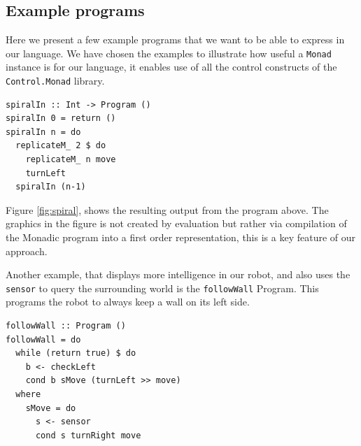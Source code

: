 \subsection{Example programs}
\FloatBarrier

Here we present a few example programs that we want to be able to express in 
our language. We have chosen the examples to illustrate how useful a 
{\tt Monad} instance is for our language, it enables use of all the control 
constructs of the {\tt Control.Monad} library. 

\begin{small}
\begin{verbatim} 
spiralIn :: Int -> Program () 
spiralIn 0 = return () 
spiralIn n = do
  replicateM_ 2 $ do
    replicateM_ n move
    turnLeft
  spiralIn (n-1) 
\end{verbatim}
\end{small}

Figure \ref{fig:spiral}, shows the resulting output from the program above. The
graphics in the figure is not created by evaluation but rather via compilation 
of the Monadic program into a first order representation, this is a key feature 
of our approach. 

Another example, that displays more intelligence in our robot, and also 
uses the {\tt sensor} to query the surrounding world is the {\tt followWall} 
Program. This programs the robot to always keep a wall on its left side.

\begin{small}
\begin{verbatim}
followWall :: Program () 
followWall = do
  while (return true) $ do
    b <- checkLeft
    cond b sMove (turnLeft >> move) 
  where
    sMove = do
      s <- sensor
      cond s turnRight move  
\end{verbatim}
\end{small}

